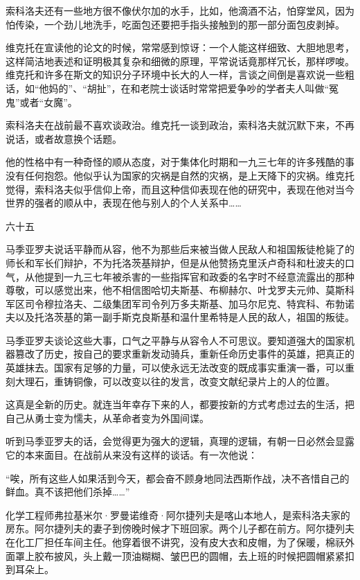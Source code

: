 索科洛夫还有一些地方很不像伏尔加的水手，比如，他滴酒不沾，怕穿堂风，因为怕传染，一个劲儿地洗手，吃面包还要把手指头接触到的那一部分面包皮剥掉。

维克托在宣读他的论文的时候，常常感到惊讶：一个人能这样细致、大胆地思考，这样简洁地表述和证明极其复杂和细微的原理，平常说话竟那样冗长，那样啰唆。维克托和许多在斯文的知识分子环境中长大的人一样，言谈之间倒是喜欢说一些粗话，如“他妈的”、“胡扯”，在和老院士谈话时常常把爱争吵的学者夫人叫做“冤鬼”或者“女魔”。

索科洛夫在战前最不喜欢谈政治。维克托一谈到政治，索科洛夫就沉默下来，不再说话，或者故意换个话题。

他的性格中有一种奇怪的顺从态度，对于集体化时期和一九三七年的许多残酷的事没有任何抱怨。他似乎认为国家的灾祸是自然的灾祸，是上天降下的灾祸。维克托觉得，索科洛夫似乎信仰上帝，而且这种信仰表现在他的研究中，表现在他对当今世界的强者的顺从中，表现在他与别人的个人关系中……

六十五

马季亚罗夫说话平静而从容，他不为那些后来被当做人民敌人和祖国叛徒枪毙了的师长和军长们辩护，不为托洛茨基辩护，但是从他赞扬克里沃卢奇科和杜波夫的口气，从他提到一九三七年被杀害的一些指挥官和政委的名字时不经意流露出的那种尊敬，可以感觉出来，他不相信图哈切夫斯基、布柳赫尔、叶戈罗夫元帅、莫斯科军区司令穆拉洛夫、二级集团军司令列万多夫斯基、加马尔尼克、特宾科、布勃诺夫以及托洛茨基的第一副手斯克良斯基和温什里希特是人民的敌人，祖国的叛徒。

马季亚罗夫谈论这些大事，口气之平静与从容令人不可思议。要知道强大的国家机器篡改了历史，按自己的要求重新发动骑兵，重新任命历史事件的英雄，把真正的英雄抹去。国家有足够的力量，可以使永远无法改变的既成事实重演一番，可以重刻大理石，重铸铜像，可以改变以往的发言，改变文献纪录片上的人的位置。

这真是全新的历史。就连当年幸存下来的人，都要按新的方式考虑过去的生活，把自己从勇士变为懦夫，从革命者变为外国间谍。

听到马季亚罗夫的话，会觉得更为强大的逻辑，真理的逻辑，有朝一日必然会显露它的本来面目。在战前从来没有这样的谈话。有一次他说：

“唉，所有这些人如果活到今天，都会奋不顾身地同法西斯作战，决不吝惜自己的鲜血。真不该把他们杀掉……”

化学工程师弗拉基米尔·罗曼诺维奇·阿尔捷列夫是喀山本地人，是索科洛夫家的房东。阿尔捷列夫的妻子到傍晚时候才下班回家。两个儿子都在前方。阿尔捷列夫在化工厂担任车间主任。他穿着很不讲究，没有皮大衣和皮帽，为了保暖，棉祆外面罩上胶布披风，头上戴一顶油糊糊、皱巴巴的圆帽，去上班的时候把圆帽紧紧扣到耳朵上。

